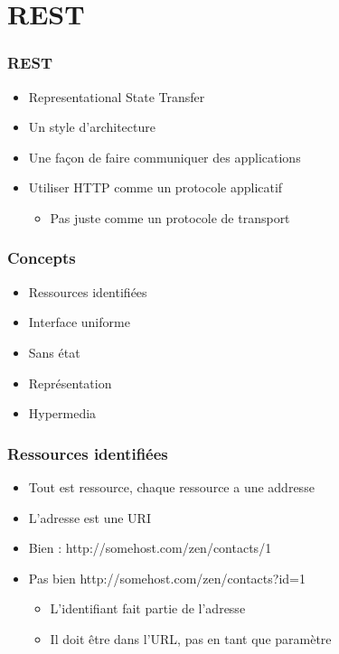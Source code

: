 \section{REST}


\begin{frame}
 \frametitle{REST}
 \begin{itemize}
  \item Representational State Transfer
  \item Un style d'architecture
  \item Une façon de faire communiquer des applications
  \item Utiliser HTTP comme un protocole applicatif
  \begin{itemize}
   \item Pas juste comme un protocole de transport
  \end{itemize}
 \end{itemize}
\end{frame}

\begin{frame}
 \frametitle{Concepts}
 
 \begin{itemize}
  \item Ressources identifiées
  \item Interface uniforme
  \item Sans état
  \item Représentation
  \item Hypermedia
 \end{itemize} 

\end{frame}

\begin{frame}
 \frametitle{Ressources identifiées}
 
 \begin{itemize}
  \item Tout est ressource, chaque ressource a une addresse
  \item L'adresse est une URI
  \item Bien : http://somehost.com/zen/contacts/1
  \item Pas bien http://somehost.com/zen/contacts?id=1
  \begin{itemize}
   \item L'identifiant fait partie de l'adresse
   \item Il doit être dans l'URL, pas en tant que paramètre
  \end{itemize}
 \end{itemize} 

\end{frame}

